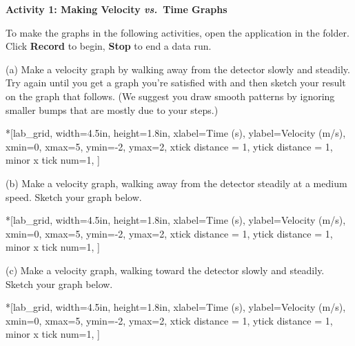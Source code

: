 \bigskip

\textbf{Activity 1: Making Velocity \textit{vs.}~Time Graphs} 

To make the graphs in the following activities, open the  application in the \filename{\coursefolder} folder. Click \textbf{Record} to begin, \textbf{Stop} to end a data run.

(a) Make a velocity graph by walking away from the detector slowly and steadily.
Try again until you get a graph you're satisfied with and then sketch your result
on the graph that follows. (We suggest you draw smooth patterns by ignoring
smaller bumps that are mostly due to your steps.)

\begin{lab_axis}*[lab_grid,
	width=4.5in, height=1.8in,
	xlabel={Time (s)},
	ylabel={Velocity (m/s)},
	xmin=0, xmax=5,
	ymin=-2, ymax=2,
	xtick distance = 1,
	ytick distance = 1,
	minor x tick num=1,
	]
\end{lab_axis}

(b) Make a velocity graph, walking away from the detector steadily at a medium
speed. Sketch your graph below.

\begin{lab_axis}*[lab_grid,
	width=4.5in, height=1.8in,
	xlabel={Time (s)},
	ylabel={Velocity (m/s)},
	xmin=0, xmax=5,
	ymin=-2, ymax=2,
	xtick distance = 1,
	ytick distance = 1,
	minor x tick num=1,
	]
\end{lab_axis}

(c) Make a velocity graph, walking toward the detector slowly and steadily.
Sketch your graph below.

\begin{lab_axis}*[lab_grid,
	width=4.5in, height=1.8in,
	xlabel={Time (s)},
	ylabel={Velocity (m/s)},
	xmin=0, xmax=5,
	ymin=-2, ymax=2,
	xtick distance = 1,
	ytick distance = 1,
	minor x tick num=1,
	]
\end{lab_axis}

